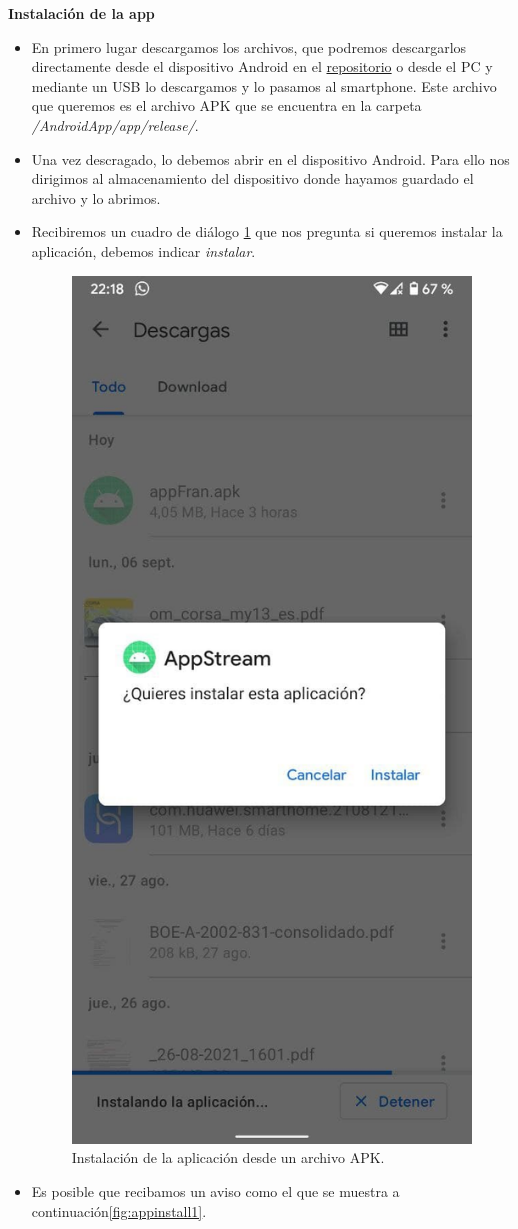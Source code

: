 \textbf{Instalación de la app}\\

\begin{itemize}
\item
	En primero lugar descargamos los archivos, que podremos descargarlos directamente desde el dispositivo Android en el \href{https://github.com/fmv1001/LocalStream}{repositorio} o desde el PC y mediante un USB lo descargamos y lo pasamos al smartphone.
	Este archivo que queremos es el archivo APK que se encuentra en la carpeta \textit{/AndroidApp/app/release/}.
\item
	Una vez descragado, lo debemos abrir en el dispositivo Android.
	Para ello nos dirigimos al almacenamiento del dispositivo donde hayamos guardado el archivo y lo abrimos.
\item
	Recibiremos un cuadro de diálogo \ref{fig:appinstall} que nos pregunta si queremos instalar la aplicación, debemos indicar \textit{instalar}.
\begin{figure}[h!]
	\centering
	\includegraphics[width=0.35\linewidth]{img/appinstall}
	\caption{Instalación de la aplicación desde un archivo APK.}
	\label{fig:appinstall}
\end{figure}
\item
	Es posible que recibamos un aviso como el que se muestra a continuación\ref{fig:appinstall1}.\\
\begin{figure}[h!]
	\centering

\end{figure}
\end{itemize}
